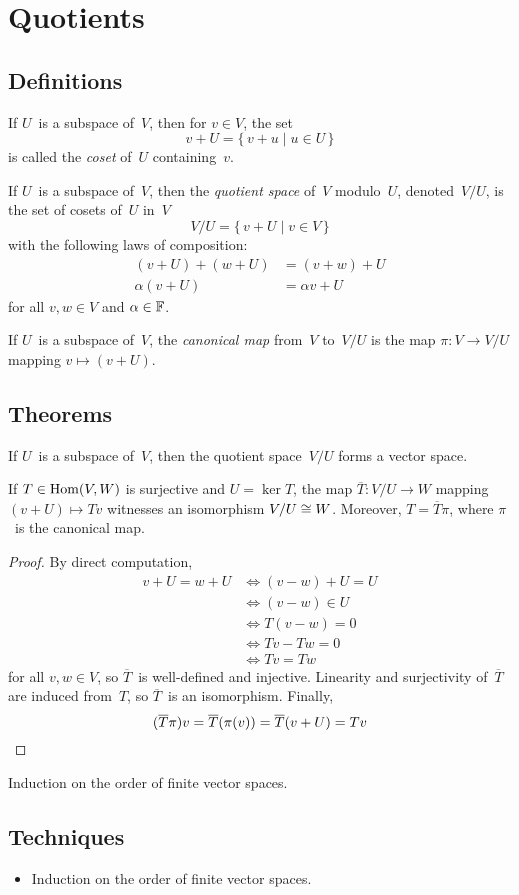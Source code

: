 %
%
%
\section{Quotients}
\subsection*{Definitions}
\begin{defn}
If \(U\)~is a subspace of~\(V\), then for \(v\in V\), the set
\[v+U=\{\,v+u\mid u\in U\,\}\]
is called the \emph{coset} of~\(U\) containing~\(v\).
\end{defn}
\begin{defn}
If \(U\)~is a subspace of~\(V\), then the \emph{quotient space} of~\(V\) modulo~\(U\), denoted~\(V/U\), is the set of cosets of~\(U\) in~\(V\)
\[V/U=\{\,v+U\mid v\in V\,\}\]
with the following laws of composition:
\begin{align*}
(v+U)+(w+U)&=(v+w)+U\\
\alpha(v+U)&=\alpha v+U
\end{align*}
for all \(v,w\in V\) and \(\alpha\in\mathbb{F}\).
\end{defn}
\begin{defn}
If \(U\)~is a subspace of~\(V\), the \emph{canonical map} from~\(V\) to~\(V/U\) is the map \(\pi:V\to V/U\) mapping \(v\mapsto(v+U)\).
\end{defn}
\subsection*{Theorems}
\begin{thm}
If \(U\)~is a subspace of~\(V\), then the quotient space~\(V/U\) forms a vector space.
\end{thm}

\begin{thm}
If \(T\in\operatorname{Hom}(V,W)\) is surjective and \(U=\ker T\), the map \(\overline{T}:V/U\to W\) mapping \((v+U)\mapsto Tv\) witnesses an isomorphism \(V/U\cong W\). Moreover, \(T=\overline{T}\pi\), where \(\pi\)~is the canonical map.
\end{thm}
\begin{proof}
By direct computation,
\begin{align*}
v+U=w+U&\iff(v-w)+U=U\\
        &\iff(v-w)\in U\\
        &\iff T(v-w)=0\\
        &\iff Tv-Tw=0\\
        &\iff Tv=Tw
\end{align*}
for all \(v,w\in V\), so \(\overline{T}\)~is well-defined and injective. Linearity and surjectivity of~\(\overline{T}\) are induced from~\(T\), so \(\overline{T}\)~is an isomorphism. Finally,
\[(\overline{T}\pi)v=\overline{T}(\pi(v))=\overline{T}(v+U)=Tv\qedhere\]
\end{proof}
\begin{app}
Induction on the order of finite vector spaces.
\end{app}
\subsection*{Techniques}
\begin{itemize}[itemsep=0pt]
\item Induction on the order of finite vector spaces.
\end{itemize}
